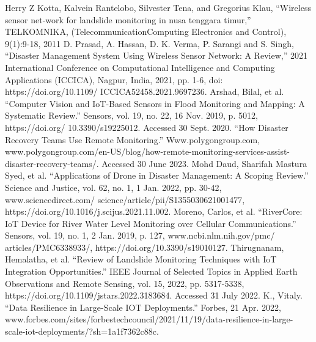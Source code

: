 \documentclass[conference]{IEEEtran}
\begin{document}




\begin{thebibliography}{00}
	 Herry Z Kotta, Kalvein Rantelobo, Silvester Tena, and Gregorius Klau, ``Wireless sensor
	net-work for landslide monitoring in nusa tenggara timur,'' TELKOMNIKA, (TelecommunicationComputing
	Electronics and Control), 9(1):9-18, 2011
	 D. Prasad, A. Hassan, D. K. Verma, P. Sarangi and S. Singh, ``Disaster Management System
	Using Wireless Sensor Network: A Review,'' 2021 International Conference on Computational Intelligence
	and Computing Applications (ICCICA), Nagpur, India, 2021, pp. 1-6, doi: https://doi.org/10.1109/
	ICCICA52458.2021.9697236.
	 Arshad, Bilal, et al. ``Computer Vision and IoT-Based Sensors in Flood Monitoring and
	Mapping: A Systematic Review.'' Sensors, vol. 19, no. 22, 16 Nov. 2019, p. 5012, https://doi.org/
	10.3390/s19225012. Accessed 30 Sept. 2020.
	 ``How Disaster Recovery Teams Use Remote Monitoring.'' Www.polygongroup.com,
	www.polygongroup.com/en-US/blog/how-remote-monitoring-services-assist-disaster-recovery-teams/.
	Accessed 30 June 2023.
	 Mohd Daud, Sharifah Mastura Syed, et al. ``Applications of Drone in Disaster Management: A
	Scoping Review.'' Science and Justice, vol. 62, no. 1, 1 Jan. 2022, pp. 30-42, www.sciencedirect.com/
	science/article/pii/S1355030621001477, https://doi.org/10.1016/j.scijus.2021.11.002.
	 Moreno, Carlos, et al. ``RiverCore: IoT Device for River Water Level Monitoring over
	Cellular Communications.'' Sensors, vol. 19, no. 1, 2 Jan. 2019, p. 127, www.ncbi.nlm.nih.gov/pmc/
	articles/PMC6338933/, https://doi.org/10.3390/s19010127.
	 Thirugnanam, Hemalatha, et al. ``Review of Landslide Monitoring Techniques with IoT
	Integration Opportunities.'' IEEE Journal of Selected Topics in Applied Earth Observations and Remote
	Sensing, vol. 15, 2022, pp. 5317-5338, https://doi.org/10.1109/jstars.2022.3183684. Accessed 31 July
	2022.
	 K., Vitaly. ``Data Resilience in Large-Scale IOT Deployments.'' Forbes, 21 Apr. 2022, www.forbes.com/sites/forbestechcouncil/2021/11/19/data-resilience-in-large-scale-iot-deployments/?sh=1a1f7362c88c. 

	




\end{thebibliography}

\vspace{12pt}
\end{document}

